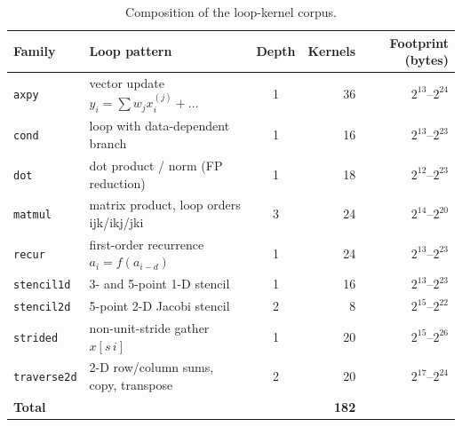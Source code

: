 \begin{table}[H]
\centering
\caption{Composition of the loop-kernel corpus.}
\label{tab:corpus}
\small

\begin{tabular}{llcrr}
\toprule
\textbf{Family} & \textbf{Loop pattern} & \textbf{Depth} & \textbf{Kernels} & \textbf{Footprint (bytes)} \\
\midrule
\texttt{axpy} & vector update $y_i=\sum w_jx^{(j)}_i+\dots$ & 1 & 36 & $2^{13}$--$2^{24}$ \\
\texttt{cond} & loop with data-dependent branch & 1 & 16 & $2^{13}$--$2^{23}$ \\
\texttt{dot} & dot product / norm (FP reduction) & 1 & 18 & $2^{12}$--$2^{23}$ \\
\texttt{matmul} & matrix product, loop orders ijk/ikj/jki & 3 & 24 & $2^{14}$--$2^{20}$ \\
\texttt{recur} & first-order recurrence $a_i=f(a_{i-d})$ & 1 & 24 & $2^{13}$--$2^{23}$ \\
\texttt{stencil1d} & 3- and 5-point 1-D stencil & 1 & 16 & $2^{13}$--$2^{23}$ \\
\texttt{stencil2d} & 5-point 2-D Jacobi stencil & 2 & 8 & $2^{15}$--$2^{22}$ \\
\texttt{strided} & non-unit-stride gather $x[s\,i]$ & 1 & 20 & $2^{15}$--$2^{26}$ \\
\texttt{traverse2d} & 2-D row/column sums, copy, transpose & 2 & 20 & $2^{17}$--$2^{24}$ \\
\textbf{Total} &  &  & \textbf{182} &  \\
\bottomrule
\end{tabular}
\end{table}
